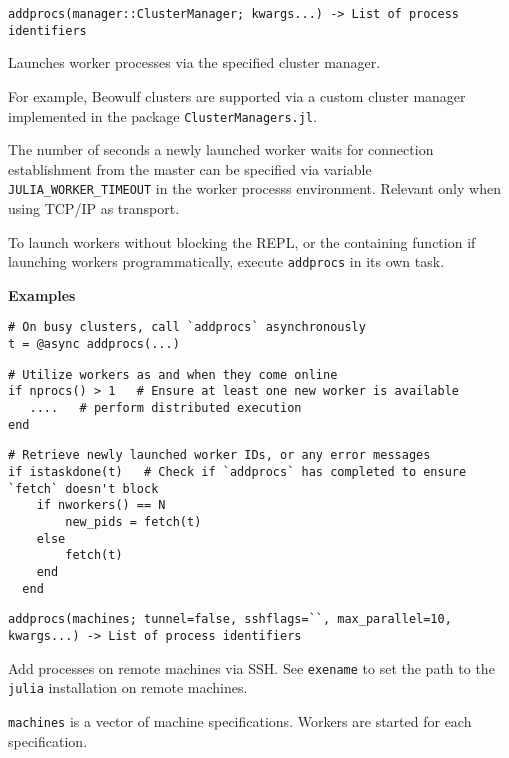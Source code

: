 \begin{adjustwidth}{2em}{0pt}


\begin{verbatim}
addprocs(manager::ClusterManager; kwargs...) -> List of process identifiers
\end{verbatim}

Launches worker processes via the specified cluster manager.

For example, Beowulf clusters are supported via a custom cluster manager implemented in the package \texttt{ClusterManagers.jl}.

The number of seconds a newly launched worker waits for connection establishment from the master can be specified via variable \texttt{JULIA\_WORKER\_TIMEOUT} in the worker process{\textquotesingle}s environment. Relevant only when using TCP/IP as transport.

To launch workers without blocking the REPL, or the containing function if launching workers programmatically, execute \texttt{addprocs} in its own task.

\textbf{Examples}


\begin{verbatim}
# On busy clusters, call `addprocs` asynchronously
t = @async addprocs(...)
\end{verbatim}


\begin{verbatim}
# Utilize workers as and when they come online
if nprocs() > 1   # Ensure at least one new worker is available
   ....   # perform distributed execution
end
\end{verbatim}


\begin{verbatim}
# Retrieve newly launched worker IDs, or any error messages
if istaskdone(t)   # Check if `addprocs` has completed to ensure `fetch` doesn't block
    if nworkers() == N
        new_pids = fetch(t)
    else
        fetch(t)
    end
  end
\end{verbatim}




\begin{lstlisting}
addprocs(machines; tunnel=false, sshflags=``, max_parallel=10, kwargs...) -> List of process identifiers
\end{lstlisting}

Add processes on remote machines via SSH. See \texttt{exename} to set the path to the \texttt{julia} installation on remote machines.

\texttt{machines} is a vector of machine specifications. Workers are started for each specification.


\end{adjustwidth}
